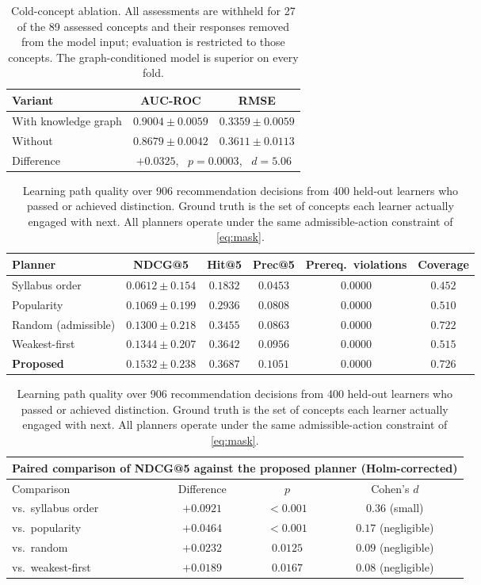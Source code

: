 \documentclass[conference]{IEEEtran}
\begin{document}
\begin{table}[t]
\centering
\caption{Cold-concept ablation. All assessments are withheld for 27 of the 89 assessed
concepts and their responses removed from the model input; evaluation is restricted to
those concepts. The graph-conditioned model is superior on every fold.}
\label{tab:coldconcept}
\begin{tabular}{lcc}
\toprule
Variant & AUC-ROC & RMSE \\
\midrule
With knowledge graph & $\mathbf{0.9004 \pm 0.0059}$ & $\mathbf{0.3359 \pm 0.0059}$ \\
Without              & $0.8679 \pm 0.0042$ & $0.3611 \pm 0.0113$ \\
\midrule
Difference & \multicolumn{2}{c}{$+0.0325$, \ $p = 0.0003$, \ $d = 5.06$} \\
\bottomrule
\end{tabular}
\end{table}

\begin{table}[t]
\centering
\caption{Learning path quality over 906 recommendation decisions from 400 held-out
learners who passed or achieved distinction. Ground truth is the set of concepts each
learner actually engaged with next. All planners operate under the same admissible-action
constraint of \eqref{eq:mask}.}
\label{tab:pathquality}
\begin{tabular}{lccccc}
\toprule
Planner & NDCG@5 & Hit@5 & Prec@5 & Prereq.\ violations & Coverage \\
\midrule
Syllabus order      & $0.0612 \pm 0.154$ & $0.1832$ & $0.0453$ & $0.0000$ & $0.452$ \\
Popularity          & $0.1069 \pm 0.199$ & $0.2936$ & $0.0808$ & $0.0000$ & $0.510$ \\
Random (admissible) & $0.1300 \pm 0.218$ & $0.3455$ & $0.0863$ & $0.0000$ & $0.722$ \\
Weakest-first       & $0.1344 \pm 0.207$ & $0.3642$ & $0.0956$ & $0.0000$ & $0.515$ \\
\textbf{Proposed}   & $\mathbf{0.1532 \pm 0.238}$ & $\mathbf{0.3687}$ & $\mathbf{0.1051}$ & $\mathbf{0.0000}$ & $\mathbf{0.726}$ \\
\bottomrule
\end{tabular}

\vspace{3pt}
{\footnotesize
\begin{tabular}{lccc}
\multicolumn{4}{c}{Paired comparison of NDCG@5 against the proposed planner (Holm-corrected)}\\
\toprule
Comparison & Difference & $p$ & Cohen's $d$ \\
\midrule
vs.\ syllabus order  & $+0.0921$ & $<0.001$ & $0.36$ (small) \\
vs.\ popularity      & $+0.0464$ & $<0.001$ & $0.17$ (negligible) \\
vs.\ random          & $+0.0232$ & $0.0125$ & $0.09$ (negligible) \\
vs.\ weakest-first   & $+0.0189$ & $0.0167$ & $0.08$ (negligible) \\
\bottomrule
\end{tabular}}
\end{table}
\end{document}
